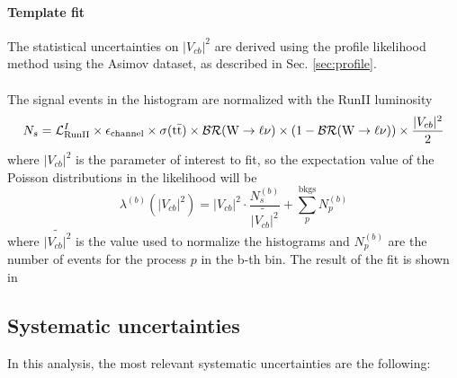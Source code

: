 \paragraph*{Template fit}
The statistical uncertainties on $|V_{cb}|^2$ are derived using the profile likelihood method using the Asimov dataset, as described in Sec. \ref{sec:profile}.\\
\\
The signal events in the histogram are normalized with the RunII luminosity
\begin{equation*}
    N_s=\mathcal{L}_{\text{RunII}}^I \times \epsilon_{\text{channel}}\times \sigma({{\text{t}}{\bar{\text{t}}}})\times \mathcal{BR}({\text{W}} \to \ell \nu)\times (1-\mathcal{BR}({\text{W}} \to \ell \nu)) \times \frac{|V_{cb}|^2}{2}
\end{equation*}
where $|V_{cb}|^2$ is the parameter of interest to fit, so the expectation value of the Poisson distributions in the likelihood will be
\begin{equation*}
    \lambda^{(b)}(|V_{cb}|^2) = |V_{cb}|^2 \cdot \dfrac{N_s^{(b)}}{\widetilde{|V_{cb}|^2}}+\sum_p^{\text{bkgs}} N_p^{(b)}
\end{equation*}
where $\widetilde{|V_{cb}|^2}$ is the value used to normalize the histograms and $N_p^{(b)}$ are the number of events for the process $p$ in the b-th bin.
The result of the fit is shown in 


\subsection{Systematic uncertainties}

In this analysis, the most relevant systematic uncertainties are the following:

